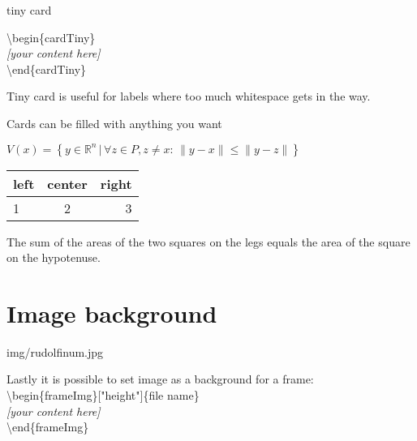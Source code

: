 \documentclass[aspectratio=43]{beamer}
\begin{document}
\begin{frame}{tiny card}
\begin{cardTiny}
\end{cardTiny}

\begin{card}
{\color{primary} \textbackslash begin\{cardTiny\}\\[2mm]}
\null\qquad \textit{[your content here]}\\[2mm]
{\color{primary} \textbackslash end\{cardTiny\}}
\end{card}
\begin{card}
Tiny card is useful for labels where too much whitespace gets in the way. 
\end{card}
\end{frame}

\begin{frame}{Cards can be filled with anything you want}

\begin{card}
\centering$V(x) = \left\{ y \in \mathbb{R}^n \,|\, \forall z \in P, z\neq x:\, \|y-x\|\leq\|y-z\| \right\}$
\end{card}

\begin{card}
\centering
\begin{tabular}{lcr}
left & center & right \\
\hline
1 & 2 & 3 \\
\end{tabular}
\end{card}

\begin{card}
\begin{theorem}[Pythagorean]
The sum of the areas of the two squares on the legs equals the area of the square on the hypotenuse.
\end{theorem}
\end{card}
\end{frame}

\section{Image background}
\begin{frameImg}{img/rudolfinum.jpg}
\vspace*{60mm}
\begin{cardTiny}
Lastly it is possible to set image as a background for a frame:\\[2mm]
{\color{primary} \textbackslash begin\{frameImg\}["height"]\{file name\}\\[2mm]}
\null\qquad \textit{[your content here]}\\[2mm]
{\color{primary} \textbackslash end\{frameImg\}}
\end{cardTiny}
\end{frameImg}
\end{document}
